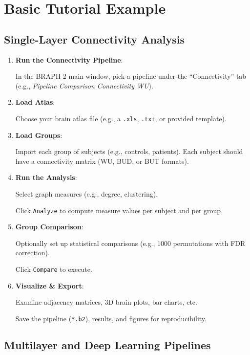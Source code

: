 \documentclass[justified]{tufte-handout}
\begin{document}
\section{Basic Tutorial Example}

\subsection{Single-Layer Connectivity Analysis}

\begin{enumerate}

\item \textbf{Run the Connectivity Pipeline}:

In the BRAPH-2 main window, pick a pipeline under the ``Connectivity'' tab (e.g., \textit{Pipeline Comparison Connectivity WU}).

\item \textbf{Load Atlas}:

Choose your brain atlas file (e.g., a \texttt{.xls}, \texttt{.txt}, or provided template).


\item \textbf{Load Groups}:

Import each group of subjects (e.g., controls, patients). Each subject should have a connectivity matrix (WU, BUD, or BUT formats).


\item \textbf{Run the Analysis}:

Select graph measures (e.g., degree, clustering).

Click \texttt{Analyze} to compute measure values per subject and per group.


\item \textbf{Group Comparison}:

Optionally set up statistical comparisons (e.g., 1000 permutations with FDR correction).

Click \texttt{Compare} to execute.


\item \textbf{Visualize \& Export}:

Examine adjacency matrices, 3D brain plots, bar charts, etc.

Save the pipeline (\texttt{*.b2}), results, and figures for reproducibility.

\end{enumerate}

\subsection{Multilayer and Deep Learning Pipelines}
\end{document}
